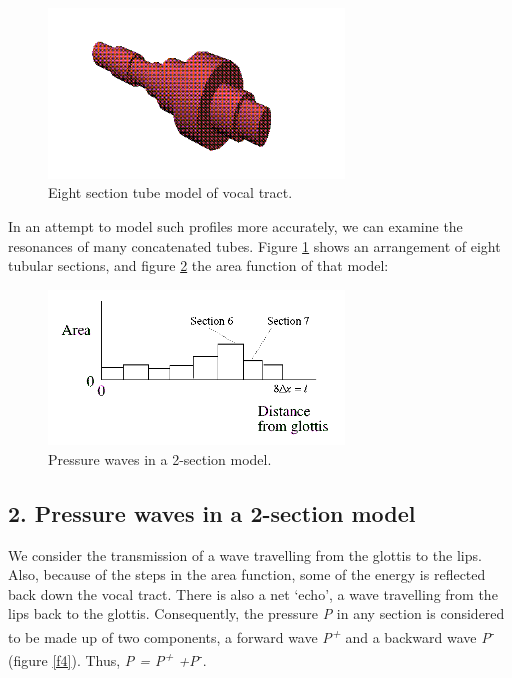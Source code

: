 \begin{figure}[htbp]
\begin{center}
\includegraphics[width=0.7\textwidth]{mp/img/eight-section-model.png}
\caption{Eight section tube model of vocal tract.}
\label{f2}
\end{center}
\end{figure}

In an attempt to model such profiles more accurately, we can examine the resonances of many concatenated tubes. Figure \ref{f2} shows an arrangement of eight tubular sections, and figure \ref{f3} the area function of that model:

\begin{figure}[htbp]
\begin{center}
\includegraphics[width=0.7\textwidth]{mp/img/eight-areas.png}
\caption{Pressure waves in a 2-section model.}
\label{f3}
\end{center}
\end{figure}

\vspace{-6mm}

\subsection*{2. Pressure waves in a 2-section model}

We consider the transmission of a wave travelling from the glottis to the lips. Also, because of the steps in the area function, some of the energy is reflected back down the vocal tract. There is also a net `echo', a wave travelling from the lips back to the glottis. Consequently, the pressure \textit{P} in any section is considered to be made up of two components, a forward wave \textit{P\textsuperscript{+}} and a backward wave \textit{P}\textsuperscript{-} (figure \ref{f4}). Thus, \textit{P = P\textsuperscript{+} +P}\textsuperscript{-}.

